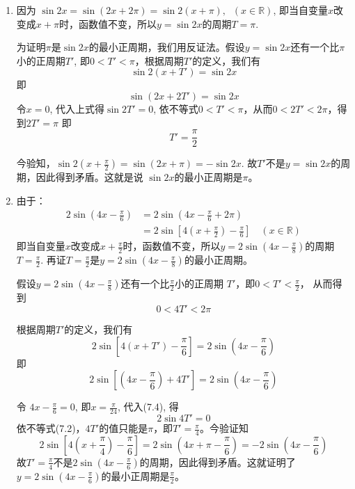 \begin{solution}
\begin{enumerate}
\item
    因为 $\sin2x =\sin(2x+2\pi)=\sin 2(x+\pi), \;\; (x\in\mathbb{R})$, 即当自变量$x$改变成$x+\pi$时，函数值不变，所以$y=\sin2x$的周期$T=\pi$.

为证明$\pi$是$\sin2x$的最小正周期，我们用反证法。假设$y=\sin2x$还有一个比$\pi$小的正周期$T'$, 即$0<T'<\pi$，根据周期$T'$的定义，我们有
\[\sin2 (x+T') =\sin2x\]
即
$$\sin (2x+2T') =\sin2x$$
令$x=0$, 代入上式得$\sin 2T'=0$,
依不等式$0<T'<\pi$，从而$0<2T'<2\pi$，得到$2T'=\pi$
即
\[T'=\frac{\pi}{2}\]

今验知，$\sin2\left(x+\frac{\pi}{2}\right)=\sin(2x+\pi)=-\sin2x$. 故$T'$不是$y=\sin2x$的周期，因此得到矛盾。这就是说 $\sin 2x$的最小正周期是$\pi$。



\item 由于：
\[\begin{split}
    2\sin\left(4x-\frac{\pi}{6}\right)&=2\sin\left(4x-\frac{\pi}{6}+2\pi\right)\\
    &=2\sin\left[4\left(x+\frac{\pi}{2}\right)-\frac{\pi}{6}\right]\quad (x\in\mathbb{R})
\end{split}\]
即当自变量$x$改变成$x+\frac{\pi}{2}$时，函数值不变，所以$y=
2\sin\left(4x-\frac{\pi}{8}\right)$的周期$T=\frac{\pi}{2}$. 再证$T=\frac{\pi}{2}$是$y=2\sin\left(4x-\frac{\pi}{8}\right)$的最小正周期。

假设$y=2\sin\left(4x-\frac{\pi}{8}\right)$还有一个比$\frac{\pi}{2}$小的正周期
$T'$，即$0<T'<\frac{\pi}{2}$，
从而得到
\begin{equation}
    0<4T'<2\pi
\end{equation}

根据周期$T'$的定义，我们有
\begin{equation}
    2\sin \left[4(x+T')-\frac{\pi}{6}\right]=2\sin \left(4x-\frac{\pi}{6}\right)
\end{equation}
即
\begin{equation}
    2\sin \left[\left(4x-\frac{\pi}{6}\right)+4T'\right]=2\sin \left(4x-\frac{\pi}{6}\right)
\end{equation}

令 $4x-\frac{\pi}{6}=0$, 即$x=\frac{\pi}{24}$, 代入(7.4), 得
$$2\sin 4T'=0$$
依不等式(7.2)，$4T'$的值只能是$\pi$，即$T'=\frac{\pi}{4}$。今验证知
\[2\sin\left[4\left(x+\frac{\pi}{4}\right)-\frac{\pi}{6}\right]=2\sin \left(4x+\pi-\frac{\pi}{6}\right)=-2\sin\left(4x-\frac{\pi}{6}\right)\]
故$T'=\frac{\pi}{4}$不是$2\sin\left(4x-\frac{\pi}{6}\right)$的周期，因此得到矛盾。这就证明了$y=2\sin\left(4x-\frac{\pi}{6}\right)$的最小正周期是$\frac{\pi}{2}$。
\end{enumerate}
\end{solution}

